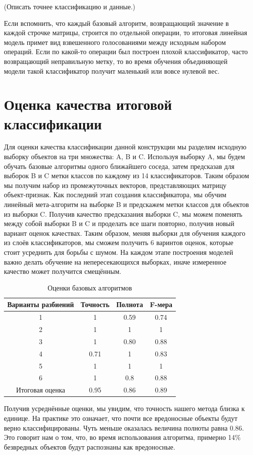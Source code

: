 (Описать точнее классификацию и данные.)

Если вспомнить, что каждый базовый алгоритм, возвращающий значение в каждой строчке матрицы, строится по отдельной операции, то итоговая линейная модель примет вид взвешенного голосованиями между исходным набором операций. Если по какой-то операции был построен плохой классификатор, часто возвращающий неправильную метку, то во время обучения объединяющей модели такой классификатор получит маленький или вовсе нулевой вес.

\section{Оценка качества итоговой классификации}

Для оценки качества классификации данной конструкции мы разделим исходную выборку объектов на три множества: A, B и C. Используя выборку A, мы будем обучать базовые алгоритмы одного ближайшего соседа, затем предсказав для выборок B и C метки классов по каждому из 14 классификаторов. Таким образом мы получим набор из промежуточных векторов, представляющих матрицу объект-признак. Как последний этап создания классификатора, мы обучим линейный мета-алгоритм на выборке B и предскажем метки классов для объектов из выборки C. Получив качество предсказания выборки C, мы можем поменять между собой выборки B и C и проделать все шаги повторно, получив новый вариант оценок качествах. Таким образом, меняя выборки для обучения каждого из слоёв классификаторов, мы сможем получить 6 варинтов оценок, которые стоит усреднить для борьбы с шумом. На каждом этапе построения моделей важно делать обучение на непересекающихся выборках, иначе измеренное качество может получится смещённым.

\bgroup
\def\arraystretch{1.5}%
\begin{table}[ht]
\caption{Оценки базовых алгоритмов}
\label{tab_weight}
\centering
    \begin{tabular}{|c|c|c|c|}
	\hline Варианты разбиений & Точность & Полнота & F-мера \\
	\hline 1 & 1 & 0.59 & 0.74 \\
	\hline 2 & 1 & 1 & 1 \\
	\hline 3 & 1 & 0.80 & 0.88 \\
	\hline 4 & 0.71 & 1 & 0.83 \\
	\hline 5 & 1 & 1 & 1 \\
	\hline 6 & 1 & 0.8 & 0.88 \\
	\hline Итоговая оценка & 0.95 & 0.86 & 0.89 \\
	\hline
    \end{tabular}
\end{table}
\egroup

Получив усреднённые оценки, мы увидим, что точность нашего метода близка к единице. На практике это означает, что почти все вредоносные объекты будут верно классифицированы. Чуть меньше оказалась величина полноты равна 0.86. Это говорит нам о том, что, во время использования алгоритма, примерно 14\% безвредных объектов будут распознаны как вредоносные.